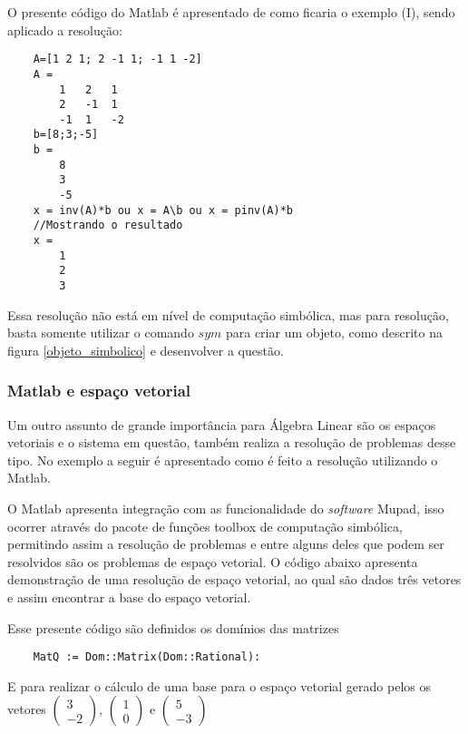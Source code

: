 O presente código do Matlab é apresentado de como ficaria o exemplo (I), sendo aplicado a resolução:

\begin{lstlisting}
    A=[1 2 1; 2 -1 1; -1 1 -2]
    A =
        1   2   1
        2   -1  1
        -1  1   -2
    b=[8;3;-5]
    b =
        8
        3
        -5
    x = inv(A)*b ou x = A\b ou x = pinv(A)*b
    //Mostrando o resultado
    x =
        1
        2
        3
\end{lstlisting}

Essa resolução não está em nível de computação simbólica, mas para resolução, basta somente utilizar o comando $sym$ para criar um objeto, como descrito na figura \ref{objeto_simbolico} e desenvolver a questão.

\subsubsection{Matlab e espaço vetorial}
\label{matlab_espaco_vetorial}
\noindent Um outro assunto de grande importância para Álgebra Linear são os espaços vetoriais e o sistema em questão, também realiza a resolução de problemas desse tipo. No exemplo a seguir é apresentado como é feito a resolução utilizando o Matlab.

O Matlab apresenta integração com as funcionalidade do \textit{software} Mupad, isso ocorrer através do pacote de funções toolbox de computação simbólica, permitindo assim a resolução de problemas e entre alguns deles que podem ser resolvidos são os problemas de espaço vetorial. O código abaixo apresenta demonstração de uma resolução de espaço vetorial, ao qual são dados três vetores e assim encontrar a base do espaço vetorial.

Esse presente código são definidos os domínios das matrizes
\begin{lstlisting}
    MatQ := Dom::Matrix(Dom::Rational):
\end{lstlisting}
E para realizar o cálculo de uma base para o espaço vetorial gerado pelos os vetores $\begin{pmatrix}
3 \\
-2
\end{pmatrix}$, 
$\begin{pmatrix}
1 \\
0
\end{pmatrix}$ e 
$\begin{pmatrix}
5 \\
-3
\end{pmatrix}$

